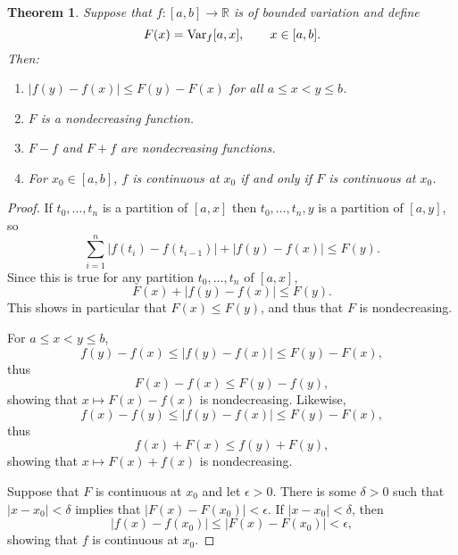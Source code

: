 \documentclass{article}
\newcommand{\Var}{\ensuremath\mathrm{Var}}
\newtheorem{theorem}{Theorem}
\theoremstyle{definition}
\begin{document}
\begin{theorem}
Suppose that $f:[a,b] \to \mathbb{R}$ is of bounded variation and define
\[
F(x) = \Var_f[a,x], \qquad x \in [a,b].
\]
Then:
\begin{enumerate}
\item $|f(y)-f(x)| \leq F(y)-F(x)$ for all $a \leq x < y \leq b$.
\item $F$ is a nondecreasing function.
\item $F-f$ and $F+f$ are nondecreasing functions.
\item For $x_0 \in [a,b]$, $f$ is continuous at $x_0$ if and only if $F$ is continuous at $x_0$.
\end{enumerate}
\label{nondecreasing}
\end{theorem}
\begin{proof}
If $t_0,\ldots,t_n$ is a partition of $[a,x]$ then
$t_0,\ldots,t_n,y$ is a partition of $[a,y]$, so
\[
\sum_{i=1}^n  |f(t_i)-f(t_{i-1})| +|f(y)-f(x)| \leq F(y).
\]
Since this is true for any partition $t_0,\ldots,t_n$ of $[a,x]$,
\[
F(x)+|f(y)-f(x)| \leq F(y).
\]
This shows in particular that $F(x) \leq F(y)$, and thus that $F$ is nondecreasing.

For $a \leq x < y \leq b$, 
\[
f(y)-f(x) \leq |f(y)-f(x)| \leq F(y)-F(x),
\]
thus
\[
F(x)-f(x) \leq F(y)-f(y),
\]
showing that $x \mapsto F(x)-f(x)$ is nondecreasing. Likewise,
\[
f(x)-f(y) \leq |f(y)-f(x)| \leq F(y)-F(x),
\]
thus
\[
f(x)+F(x) \leq f(y)+F(y),
\]
showing that $x \mapsto F(x)+f(x)$ is nondecreasing.

Suppose that $F$ is continuous at $x_0$ and let $\epsilon>0$. There is some $\delta>0$ such that
$|x-x_0|<\delta$ implies that $|F(x)-F(x_0)|<\epsilon$. If $|x-x_0|<\delta$, then
\[
|f(x)-f(x_0)| \leq |F(x)-F(x_0)|<\epsilon,
\]
showing that $f$ is continuous at $x_0$.


\end{proof}
\end{document}
